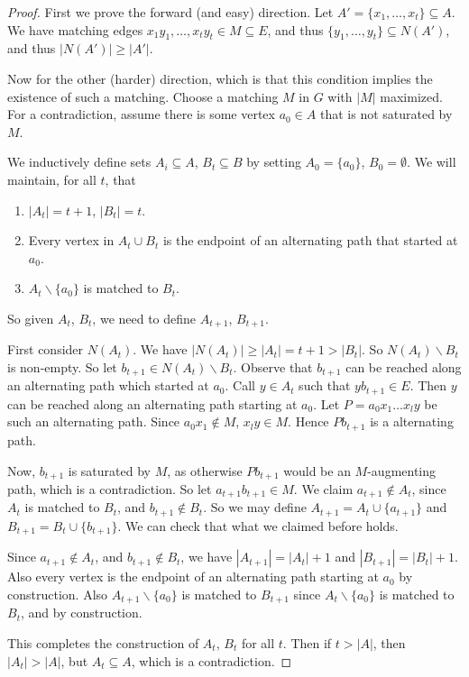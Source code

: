 \documentclass[a4paper]{scrreprt}
\begin{document}
\begin{proof}
	First we prove the forward (and easy) direction. Let $A' = \{x_1, \dots, x_t \} \subseteq A$. We have matching edges $x_1 y_1, \dots, x_t y_t \in M \subseteq E$, and thus $\{y_1, \dots, y_t\} \subseteq N(A')$, and thus $|N(A')| \geq |A'|$.

	Now for the other (harder) direction, which is that this condition implies the existence of such a matching. Choose a matching $M$ in $G$ with $|M|$ maximized. For a contradiction, assume there is some vertex $a_0 \in A$ that is not saturated by $M$.

	We inductively define sets $A_i \subseteq A$, $B_t \subseteq B$ by setting $A_0 = \{a_0\}$, $B_0 = \emptyset$. We will maintain, for all $t$, that
	\begin{enumerate}
		\item $|A_t| = t + 1$, $|B_t| = t$.
		\item Every vertex in $A_t \cup B_t$ is the endpoint of an alternating path that started at $a_0$. 
		\item $A_t \backslash \{a_0\}$ is matched to $B_t$.
	\end{enumerate}
	So given $A_t$, $B_t$, we need to define $A_{t + 1}$, $B_{t + 1}$.

	First consider $N(A_t)$. We have $|N(A_t)| \geq |A_t| = t + 1 > |B_t|$. So $N(A_t) \backslash B_t$ is non-empty. So let $b_{t + 1} \in N(A_t) \backslash B_t$. Observe that $b_{t + 1}$ can be reached along an alternating path which started at $a_0$. Call $y \in A_t$ such that $yb_{t + 1} \in E$. Then $y$ can be reached along an alternating path starting at $a_0$. Let $P = a_0 x_1 \dots x_l y$ be such an alternating path. Since $a_0x_1 \not \in M$, $x_l y \in M$. Hence $Pb_{t + 1}$ is a alternating path.

	Now, $b_{t + 1}$ is saturated by $M$, as otherwise $Pb_{t + 1}$ would be an $M$-augmenting path, which is a contradiction. So let $a_{t+1}b_{t+1} \in M$. We claim $a_{t + 1} \not \in A_t$, since $A_t$ is matched to $B_t$, and $b_{t + 1} \not \in B_t$. So we may define $A_{t + 1} = A_t \cup \{a_{t + 1}\}$ and $B_{t + 1} = B_t \cup \{b_{t + 1}\}$. We can check that what we claimed before holds. 

	Since $a_{t + 1} \not \in A_t$, and $b_{t + 1} \not \in B_t$, we have $|A_{t +1}| = |A_t| + 1$ and $|B_{t + 1}| = |B_t| + 1$. Also every vertex is the endpoint of an alternating path starting at $a_0$ by construction. Also $A_{t + 1}\backslash\{a_0\}$ is matched to $B_{t + 1}$ since $A_t\backslash\{a_0\}$ is matched to $B_t$, and by construction.

	This completes the construction of $A_t$, $B_t$ for all $t$. Then if $t > |A|$, then $|A_t| > |A|$, but $A_t \subseteq A$, which is a contradiction.
\end{proof}
\end{document}
